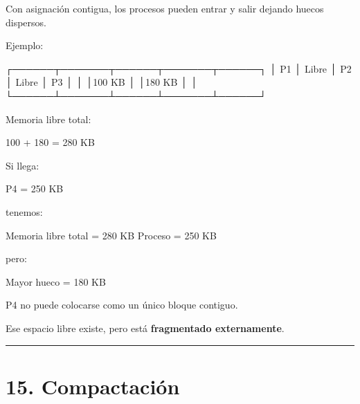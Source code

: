 \documentclass[
  spanish,
  letterpaper,
]{scrbook}
\newenvironment{Shaded}{\begin{snugshade}}{\end{snugshade}}
\newcommand{\NormalTok}[1]{\textcolor[rgb]{0.00,0.23,0.31}{#1}}
\begin{document}
Con asignación contigua, los procesos pueden entrar y salir dejando
huecos dispersos.

Ejemplo:

\begin{Shaded}
\begin{Highlighting}[]
\NormalTok{┌──────┬───────┬──────┬───────┬──────┐}
\NormalTok{│ P1   │ Libre │ P2   │ Libre │ P3   │}
\NormalTok{│      │100 KB │      │180 KB │      │}
\NormalTok{└──────┴───────┴──────┴───────┴──────┘}
\end{Highlighting}
\end{Shaded}

Memoria libre total:

\begin{Shaded}
\begin{Highlighting}[]
\NormalTok{100 + 180 = 280 KB}
\end{Highlighting}
\end{Shaded}

Si llega:

\begin{Shaded}
\begin{Highlighting}[]
\NormalTok{P4 = 250 KB}
\end{Highlighting}
\end{Shaded}

tenemos:

\begin{Shaded}
\begin{Highlighting}[]
\NormalTok{Memoria libre total = 280 KB}
\NormalTok{Proceso              = 250 KB}
\end{Highlighting}
\end{Shaded}

pero:

\begin{Shaded}
\begin{Highlighting}[]
\NormalTok{Mayor hueco = 180 KB}
\end{Highlighting}
\end{Shaded}

P4 no puede colocarse como un único bloque contiguo.

Ese espacio libre existe, pero está \textbf{fragmentado externamente}.

\begin{center}\rule{0.5\linewidth}{0.5pt}\end{center}


\chapter{15. Compactación}\label{compactaciuxf3n-1}
\end{document}

